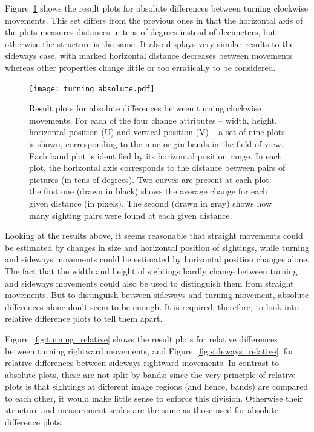 \documentclass[twocolumn, 9pt]{jsproceedings}
\begin{document}
Figure~\ref{fig:turning_absolute} shows the result plots for absolute differences between turning clockwise movements. This set differs from the previous ones in that the horizontal axis of the plots measures distances in tens of degrees instead of decimeters, but otherwise the structure is the same. It also displays very similar results to the sideways case, with marked horizontal distance decreases between movements whereas other properties change little or too erratically to be considered.

\begin{figure}[h!]
\texttt{[image: turning\_absolute.pdf]}
\caption{Result plots for absolute differences between turning clockwise movements. For each of the four change attributes -- width, height, horizontal position (U) and vertical position (V) -- a set of nine plots is shown, corresponding to the nine origin bands in the field of view. Each band plot is identified by its horizontal position range. In each plot, the horizontal axis corresponds to the distance between pairs of pictures (in tens of degrees). Two curves are present at each plot: the first one (drawn in black) shows the average change for each given distance (in pixels). The second (drawn in gray) shows how many sighting pairs were found at each given distance.}
\label{fig:turning_absolute}
\end{figure}

Looking at the results above, it seems reasonable that straight movements could be estimated by changes in size and horizontal position of sightings, while turning and sideways movements could be estimated by horizontal position changes alone. The fact that the width and height of sightings hardly change between turning and sideways movements could also be used to distinguish them from straight movements. But to distinguish between sideways and turning movement, absolute differences alone don't seem to be enough. It is required, therefore, to look into relative difference plots to tell them apart.

Figure~\ref{fig:turning_relative} shows the result plots for relative differences between turning rightward movements, and Figure~\ref{fig:sideways_relative}, for relative differences between sideways rightward movements. In contrast to absolute plots, these are not split by bands: since the very principle of relative plots is that sightings at different image regions (and hence, bands) are compared to each other, it would make little sense to enforce this division. Otherwise their structure and measurement scales are the same as those used for absolute difference plots.
\end{document}
